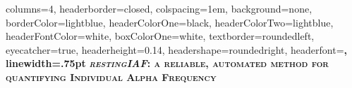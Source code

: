 \documentclass[landscape,a0paper,fontscale=.235]{xebaposter} %
\begin{document}
\begin{poster}
{
columns=4, %
headerborder=closed, %
colspacing=1em, %
background=none, %
borderColor=lightblue, %
headerColorOne=black, %
headerColorTwo=lightblue, %
headerFontColor=white, %
boxColorOne=white, %
textborder=roundedleft, %
eyecatcher=true, %
headerheight=0.14\textheight, %
headershape=roundedright, %
headerfont=\Large\bf\textsc, %
linewidth=.75pt %
}
{
\setlength\fboxsep{0pt}
\setlength\fboxrule{0pt}
}
{\bf\textsc{\emph{restingIAF}: a reliable, automated method for quantifying Individual Alpha Frequency}\vspace{.2em}} %

\end{poster}
\end{document}

